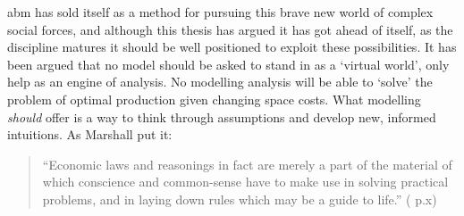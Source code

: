 \gls{abm} has sold itself as a method for pursuing this brave new world of complex social forces, and although this thesis has argued it has got ahead of itself, as the discipline matures it should be well positioned to exploit these possibilities. It has been argued that no model should be asked to stand in as a `virtual world', only help as an engine of analysis. No modelling analysis will be able to `solve' the problem of optimal production given changing space costs. What modelling \emph{should} offer is a way to think through assumptions and develop new, informed intuitions. As Marshall put it:

\begin{quote}
``Economic laws and reasonings in fact are merely a part of the material of which conscience and common-sense have to make use in solving practical problems, and in laying down rules which may be a guide to life.'' (\citealt{marshall_principles_1895} p.x)
\end{quote}

